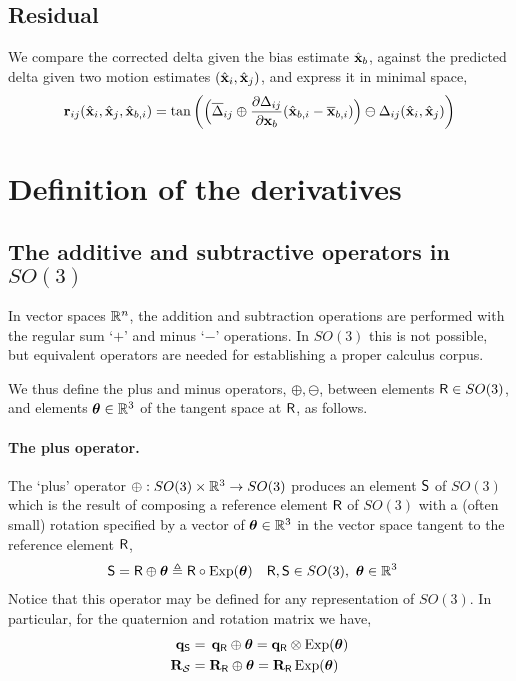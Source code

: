 \subsection{Residual}

We compare the corrected delta given the bias estimate $\hat{{\bf x}}_b$, against the predicted delta given two motion estimates $(\hat{{\bf x}}_i,\hat{{\bf x}}_j)$, and express it in minimal space,
%
\begin{align*}
{\bf r}_{ij}(\hat{{\bf x}}_i,\hat{{\bf x}}_j,\hat{{\bf x}}_{b,i}) = \tan\left( \Big(\overline{\Delta}_{ij} \oplus \frac{\partial\Delta_{ij}}{\partial{\bf x}_b} (\hat{{\bf x}}_{b,i} - \overline{{\bf x}}_{b,i})\Big) \ominus \Delta_{ij}(\hat{{\bf x}}_i , \hat{{\bf x}}_j)  \right)
\end{align*}





\newpage
\appendix

\section{Definition of the derivatives }

\subsection{The additive and subtractive operators in $SO(3)$}

In vector spaces ${\mathbb R}^n$, the addition and subtraction operations are performed with the regular sum `$+$' and minus `$-$' operations.
In $SO(3)$ this is not possible, but equivalent operators are needed for establishing a proper calculus corpus. 

We thus define the plus and minus operators, $\oplus,\ominus$, between elements $\mathsf R\in SO(3)$, and elements ${{\bm \theta}}\in{\mathbb R}^3$ of the tangent space at $\mathsf R$, as follows.

\paragraph{The plus operator.}
The `plus' operator $\oplus:SO(3)\times{\mathbb R}^3\to SO(3)$ produces an element $\mathsf S$ of $SO(3)$ which is the result of composing a reference element $\mathsf R$ of $SO(3)$ with a (often small) rotation specified by a vector of ${{\bm \theta}}\in{\mathbb R}^3$ in the vector space tangent to the reference element $\mathsf R$,
%
\begin{align}
\mathsf S = \mathsf R\oplus {{\bm \theta}} &\triangleq \mathsf R\circ\operatorname*{Exp}({{\bm \theta}}) && \mathsf R,\mathsf S\in SO(3),~ {{\bm \theta}}\in{\mathbb R}^3 
\end{align}
%
Notice that this operator may be defined for any representation of $SO(3)$. In particular, for the quaternion and rotation matrix we have,
%
\begin{align}
{\bf q}_\mathsf S &= \,{\bf q}_\mathsf R\oplus{{\bm \theta}} = {\bf q}_\mathsf R\otimes\operatorname*{Exp}({{\bm \theta}}) \\
{\bf R}_{\mathcal{S}} &= {\bf R}_\mathsf R\oplus {{\bm \theta}} = {\bf R}_\mathsf R\operatorname*{Exp}({{\bm \theta}}) 
\end{align}

